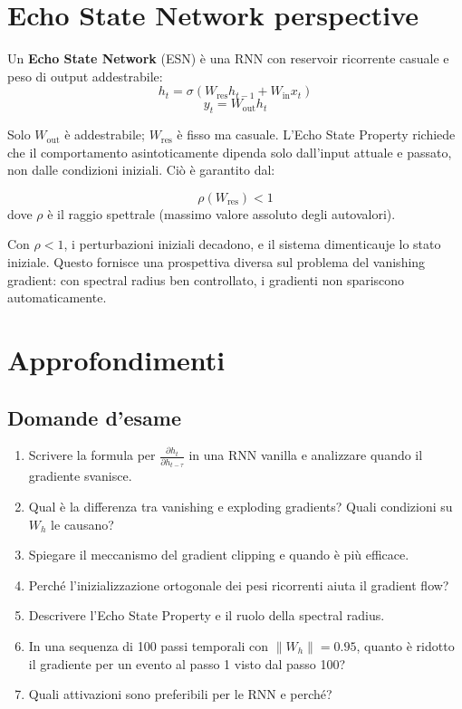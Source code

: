 \section{Echo State Network perspective}

Un \textbf{Echo State Network} (ESN) è una RNN con reservoir ricorrente casuale e peso di output addestrabile:
\[
h_t = \sigma(W_{\text{res}} h_{t-1} + W_{\text{in}} x_t)
\]
\[
y_t = W_{\text{out}} h_t
\]

Solo $W_{\text{out}}$ è addestrabile; $W_{\text{res}}$ è fisso ma casuale. L'Echo State Property richiede che il comportamento asintoticamente dipenda solo dall'input attuale e passato, non dalle condizioni iniziali. Ciò è garantito dal:

\begin{definition}
\[
\rho(W_{\text{res}}) < 1
\]
dove $\rho$ è il raggio spettrale (massimo valore assoluto degli autovalori).
\end{definition}

Con $\rho < 1$, i perturbazioni iniziali decadono, e il sistema dimenticauje lo stato iniziale. Questo fornisce una prospettiva diversa sul problema del vanishing gradient: con spectral radius ben controllato, i gradienti non spariscono automaticamente.

\section{Approfondimenti}

\subsection{Domande d'esame}

\begin{enumerate}
\item Scrivere la formula per $\frac{\partial h_t}{\partial h_{t-\tau}}$ in una RNN vanilla e analizzare quando il gradiente svanisce.
\item Qual è la differenza tra vanishing e exploding gradients? Quali condizioni su $W_h$ le causano?
\item Spiegare il meccanismo del gradient clipping e quando è più efficace.
\item Perché l'inizializzazione ortogonale dei pesi ricorrenti aiuta il gradient flow?
\item Descrivere l'Echo State Property e il ruolo della spectral radius.
\item In una sequenza di 100 passi temporali con $\|W_h\| = 0.95$, quanto è ridotto il gradiente per un evento al passo 1 visto dal passo 100?
\item Quali attivazioni sono preferibili per le RNN e perché?
\end{enumerate}

